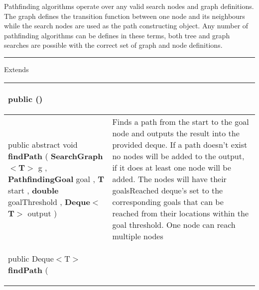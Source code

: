  {\scriptsize Pathfinding algorithms operate over any valid search nodes and graph definitions. The graph defines the transition function between one node and its neighbours while the search nodes are used as \newline%
 the path constructing object. Any number of pathfinding algorithms can be defines in these terms, both tree and graph searches are possible with the correct set of graph and node definitions.
 
\vspace*{4pt} \hrule \vspace*{3pt}
Extends \textbf{ \hyperref[tab:SearchNode]{\color{blue}{SearchNode}} }
\vspace*{-5pt} 
\begin{tabularx}{\linewidth}{X|m{}}
\label{tab:PathfindingAlgorithm}
\begin{raggedleft}public  \textbf{\hyperref[tab:PathfindingAlgorithm]{\color{blue}{PathfindingAlgorithm}}}()
\end{raggedleft} &
 \\ \hline 
\begin{raggedleft}public abstract void \textbf{findPath }(\newline \hfill 
\hspace*{ 5pt} \textbf{SearchGraph$<$T$>$} g , \newline
 \hspace*{ 5pt} \textbf{PathfindingGoal} goal , \newline
 \hspace*{ 5pt} \textbf{T} start , \newline
 \hspace*{ 5pt} \textbf{double} goalThreshold , \newline
 \hspace*{ 5pt} \textbf{Deque$<$T$>$} output  )
\end{raggedleft} &
 Finds a path from the start to the goal node and outputs the result into the provided deque.\newline%
 If a path doesn't exist no nodes will be added to the output, if it does at least one node will be added. The nodes will have their goalsReached deque's set\newline%
 to the corresponding goals that can be reached from their locations within the goal threshold. One node can reach multiple nodes\\ \hline 
\begin{raggedleft}public Deque$<$T$>$ \textbf{findPath }(\newline \hfill 

\end{raggedleft}
\end{tabularx}}
